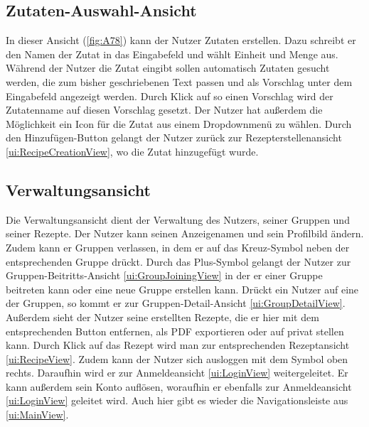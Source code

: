 \documentclass[parskip=full]{scrartcl}
\begin{document}
\subsection{Zutaten-Auswahl-Ansicht}
\label{ui:IngredientPickerView}
In dieser Ansicht (\autoref{fig:A78}) kann der Nutzer Zutaten erstellen. Dazu schreibt er den Namen der Zutat in das Eingabefeld und wählt Einheit und Menge aus. Während der Nutzer die Zutat eingibt sollen automatisch Zutaten gesucht werden, die zum bisher geschriebenen Text passen und als Vorschlag unter dem Eingabefeld angezeigt werden. Durch Klick auf so einen Vorschlag wird der Zutatenname auf diesen Vorschlag gesetzt. Der Nutzer hat außerdem die Möglichkeit ein Icon für die Zutat aus einem Dropdownmenü zu wählen. Durch den Hinzufügen-Button gelangt der Nutzer zurück zur Rezepterstellenansicht \ref{ui:RecipeCreationView}, wo die Zutat hinzugefügt wurde.

\subsection{Verwaltungsansicht} 
\label{ui:SettingsView}

Die Verwaltungsansicht dient der Verwaltung des Nutzers, seiner Gruppen und seiner Rezepte. Der Nutzer kann seinen Anzeigenamen und sein Profilbild ändern. Zudem kann er Gruppen verlassen, in dem er auf das Kreuz-Symbol neben der entsprechenden Gruppe drückt. Durch das Plus-Symbol gelangt der Nutzer zur Gruppen-Beitritts-Ansicht \ref{ui:GroupJoiningView} in der er einer Gruppe beitreten kann oder eine neue Gruppe erstellen kann. Drückt ein Nutzer auf eine der Gruppen, so kommt er zur Gruppen-Detail-Ansicht \ref{ui:GroupDetailView}. Außerdem sieht der Nutzer seine erstellten Rezepte, die er hier mit dem entsprechenden Button entfernen, als PDF exportieren oder auf privat stellen kann. Durch Klick auf das Rezept wird man zur entsprechenden Rezeptansicht \ref{ui:RecipeView}. 
Zudem kann der Nutzer sich ausloggen mit dem Symbol oben rechts. Daraufhin wird er zur Anmeldeansicht \ref{ui:LoginView} weitergeleitet. Er kann außerdem sein Konto auflösen, woraufhin er ebenfalls zur Anmeldeansicht \ref{ui:LoginView} geleitet wird. Auch hier gibt es wieder die Navigationsleiste aus \ref{ui:MainView}.
\end{document}
